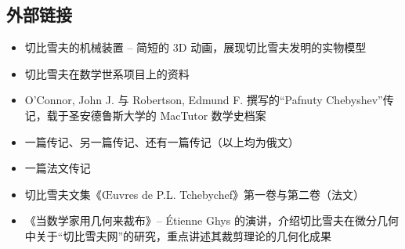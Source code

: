 \subsection{外部链接}
\begin{itemize}
\item 切比雪夫的机械装置 – 简短的 3D 动画，展现切比雪夫发明的实物模型
\item 切比雪夫在数学世系项目上的资料
\item O'Connor, John J. 与 Robertson, Edmund F. 撰写的“Pafnuty Chebyshev”传记，载于圣安德鲁斯大学的 MacTutor 数学史档案
\item 一篇传记、另一篇传记、还有一篇传记（以上均为俄文）
\item 一篇法文传记
\item 切比雪夫文集《Œuvres de P.L. Tchebychef》第一卷与第二卷（法文）
\item 《当数学家用几何来裁布》– Étienne Ghys 的演讲，介绍切比雪夫在微分几何中关于“切比雪夫网”的研究，重点讲述其裁剪理论的几何化成果
\end{itemize}
